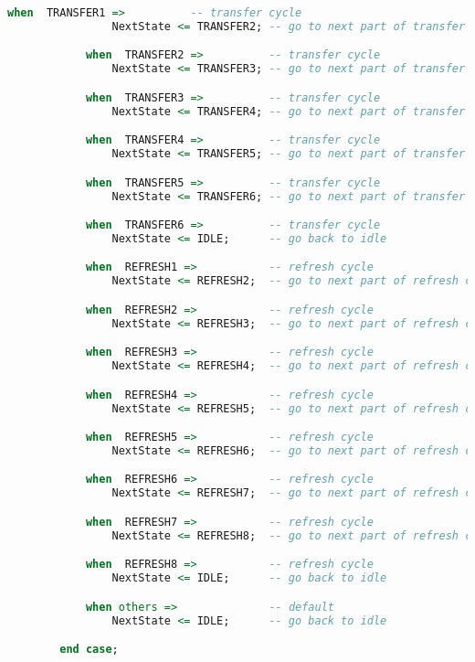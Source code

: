 \begin{lstlisting}[language=vhdl]
            when  TRANSFER1 =>          -- transfer cycle
                NextState <= TRANSFER2; -- go to next part of transfer cycle

            when  TRANSFER2 =>          -- transfer cycle
                NextState <= TRANSFER3; -- go to next part of transfer cycle

            when  TRANSFER3 =>          -- transfer cycle
                NextState <= TRANSFER4; -- go to next part of transfer cycle

            when  TRANSFER4 =>          -- transfer cycle
                NextState <= TRANSFER5; -- go to next part of transfer cycle

            when  TRANSFER5 =>          -- transfer cycle
                NextState <= TRANSFER6; -- go to next part of transfer cycle

            when  TRANSFER6 =>          -- transfer cycle
                NextState <= IDLE;      -- go back to idle

            when  REFRESH1 =>           -- refresh cycle
                NextState <= REFRESH2;  -- go to next part of refresh cycle

            when  REFRESH2 =>           -- refresh cycle
                NextState <= REFRESH3;  -- go to next part of refresh cycle

            when  REFRESH3 =>           -- refresh cycle
                NextState <= REFRESH4;  -- go to next part of refresh cycle

            when  REFRESH4 =>           -- refresh cycle
                NextState <= REFRESH5;  -- go to next part of refresh cycle

            when  REFRESH5 =>           -- refresh cycle
                NextState <= REFRESH6;  -- go to next part of refresh cycle

            when  REFRESH6 =>           -- refresh cycle
                NextState <= REFRESH7;  -- go to next part of refresh cycle

            when  REFRESH7 =>           -- refresh cycle
                NextState <= REFRESH8;  -- go to next part of refresh cycle

            when  REFRESH8 =>           -- refresh cycle
                NextState <= IDLE;      -- go back to idle

            when others =>              -- default
                NextState <= IDLE;      -- go back to idle

        end case;


\end{lstlisting}
